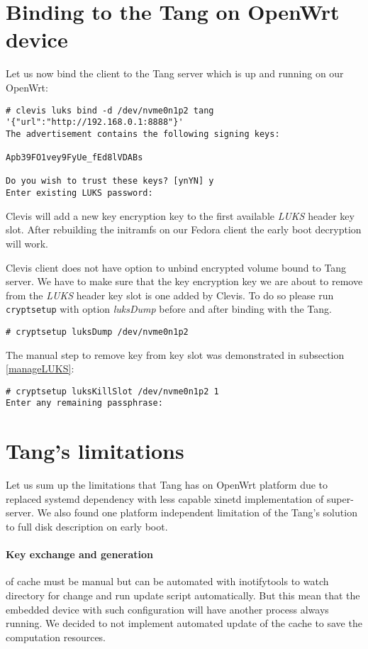 \section{Binding to the Tang on OpenWrt device}
Let us now bind the client to the Tang server which is up and running on our OpenWrt:
\begin{lstlisting}[columns=fixed,basicstyle=\ttfamily\footnotesize,tabsize=4,backgroundcolor=\color{yellow!10}]
# clevis luks bind -d /dev/nvme0n1p2 tang '{"url":"http://192.168.0.1:8888"}'
The advertisement contains the following signing keys:

Apb39FO1vey9FyUe_fEd8lVDABs

Do you wish to trust these keys? [ynYN] y
Enter existing LUKS password:
\end{lstlisting}
Clevis will add a new key encryption key to the first available {\it LUKS} header key slot.
After rebuilding the initramfs on our Fedora client the early boot decryption will work.

Clevis client does not have option to unbind encrypted volume bound to Tang server.
We have to make sure that the key encryption key we are about to remove from the {\it LUKS} header key slot is one added by Clevis.
To do so please run {\tt cryptsetup} with option {\it luksDump} before and after binding with the Tang.
\begin{lstlisting}[columns=fixed,basicstyle=\ttfamily\footnotesize,tabsize=4,backgroundcolor=\color{yellow!10}]
# cryptsetup luksDump /dev/nvme0n1p2
\end{lstlisting}
The manual step to remove key from key slot was demonstrated in subsection \ref{manageLUKS}:
\begin{lstlisting}[columns=fixed,basicstyle=\ttfamily\footnotesize,tabsize=4,backgroundcolor=\color{yellow!10}]
# cryptsetup luksKillSlot /dev/nvme0n1p2 1
Enter any remaining passphrase:
\end{lstlisting}

\section{Tang's limitations}\label{limitations}

Let us sum up the limitations that Tang has on OpenWrt platform due to replaced systemd dependency with less capable xinetd implementation of super-server.
We also found one platform independent limitation of the Tang's solution to full disk description on early boot.

\paragraph{Key exchange and generation} of cache must be manual but  can be automated with inotifytools to watch directory for change and run update script automatically.
But this mean that the embedded device with such configuration will have another process always running.
We decided to not implement automated update of the cache to save the computation resources.

